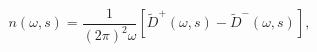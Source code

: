 \begin{equation} \label{ksy2} 
n(\omega , s)=\frac{1}{(2\pi)^2 \omega} 
\left[ 
\tilde{D}^{+}(\omega , s )- 
\tilde{D}^{-}(\omega , s ) 
\right], 
\end{equation} 
